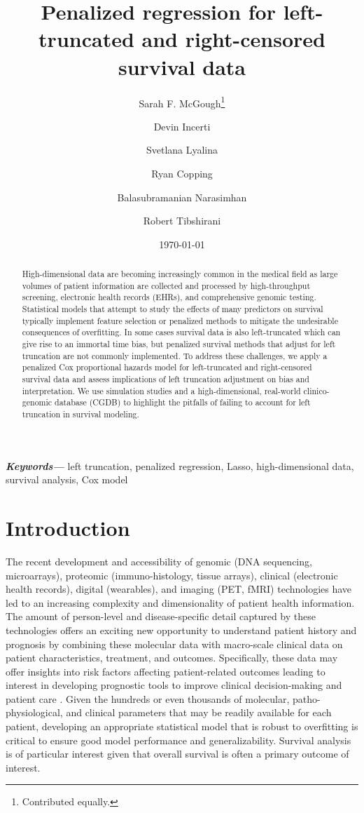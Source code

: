 \documentclass[11pt,final,fleqn]{article}\usepackage[]{graphicx}\usepackage[]{color}
\title{Penalized regression for left-truncated and right-censored survival data}
\author[1]{Sarah F. McGough\thanks{Contributed equally.}}
\author[1]{Devin Incerti\samethanks}
\author[1]{Svetlana Lyalina}
\author[1]{Ryan Copping}
\author[2, 3]{Balasubramanian Narasimhan}
\author[2, 3]{Robert Tibshirani}
\affil[1]{Genentech, Inc, South San Francisco, CA, USA}
\affil[2]{Department of Statistics, Stanford University, Stanford, CA, USA}
\affil[3]{Department of Biomedical Data Science, Stanford University, Stanford, CA, USA}
\date{\today}
\theoremstyle{plain}
\providecommand{\keywords}[1]
{
  \small	
  \textbf{\textit{Keywords---}} #1
}
\begin{document}
\maketitle

\begin{abstract}
    High-dimensional data are becoming increasingly common in the medical field as large volumes of patient information are collected and processed by high-throughput screening, electronic health records (EHRs), and comprehensive genomic testing. Statistical models that attempt to study the effects of many predictors on survival typically implement feature selection or penalized methods to mitigate the undesirable consequences of overfitting. In some cases survival data is also left-truncated which can give rise to an immortal time bias, but penalized survival methods that adjust for left truncation are not commonly implemented. To address these challenges, we apply a penalized Cox proportional hazards model for left-truncated and right-censored survival data and assess implications of left truncation adjustment on bias and interpretation. We use simulation studies and a high-dimensional, real-world clinico-genomic database (CGDB) to highlight the pitfalls of failing to account for left truncation in survival modeling.
\end{abstract}

\keywords{left truncation, penalized regression, Lasso, high-dimensional data, survival analysis, Cox model}

\section{Introduction}
The recent development and accessibility of genomic (DNA sequencing, microarrays), proteomic (immuno-histology, tissue arrays), clinical (electronic health records), digital (wearables), and imaging (PET, fMRI) technologies have led to an increasing complexity and dimensionality of patient health information. The amount of person-level and disease-specific detail captured by these technologies offers an exciting new opportunity to understand patient history and prognosis by combining these molecular data with macro-scale clinical data on patient characteristics, treatment, and outcomes. Specifically, these data may offer insights into risk factors affecting patient-related outcomes leading to interest in developing prognostic tools to improve clinical decision-making and patient care \cite{gui2005penalized, wishart2010predict, ow2016big, yousefi2017predicting}. Given the hundreds or even thousands of molecular, patho-physiological, and clinical parameters that may be readily available for each patient, developing an appropriate statistical model that is robust to overfitting is critical to ensure good model performance and generalizability. Survival analysis is of particular interest given that overall survival is often a primary outcome of interest.  
\end{document}
